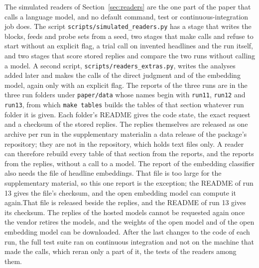 The simulated readers of Section~\ref{sec:readers} are the one part of the paper that calls a language model, and no default command, test or continuous-integration job does. The script \texttt{scripts/simulated\_readers.py} has a stage that writes the blocks, feeds and probe sets from a seed, two stages that make calls and refuse to start without an explicit flag, a trial call on invented headlines and the run itself, and two stages that score stored replies and compare the two runs without calling a model. A second script, \texttt{scripts/readers\_extras.py}, writes the analyses added later and makes the calls of the direct judgment and of the embedding model, again only with an explicit flag. The reports of the three runs are in the three run folders under \texttt{paper/data} whose names begin with \texttt{run11}, \texttt{run12} and \texttt{run13}, from which \texttt{make tables} builds the tables of that section whatever run folder it is given. Each folder's README gives the code state, the exact request and a checksum of the stored replies. The replies themselves are released as one archive per run \iftmlr{}in the supplementary material\else{}in a data release of the package's repository\fi{}; they are not in the repository, which holds text files only. A reader can therefore rebuild every table of that section from the reports, and the reports from the replies, without a call to a model. The report of the embedding classifier also needs the file of headline embeddings. \iftmlr{}That file is too large for the supplementary material, so this one report is the exception; the README of run 13 gives the file's checksum, and the open embedding model can compute it again.\else{}That file is released beside the replies, and the README of run 13 gives its checksum.\fi{} The replies of the hosted models cannot be requested again once the vendor retires the models, and the weights of the open model and of the open embedding model can be downloaded. After the last changes to the code of each run, the full test suite ran on continuous integration and not on the machine that made the calls, which reran only a part of it, the tests of the readers among them.
